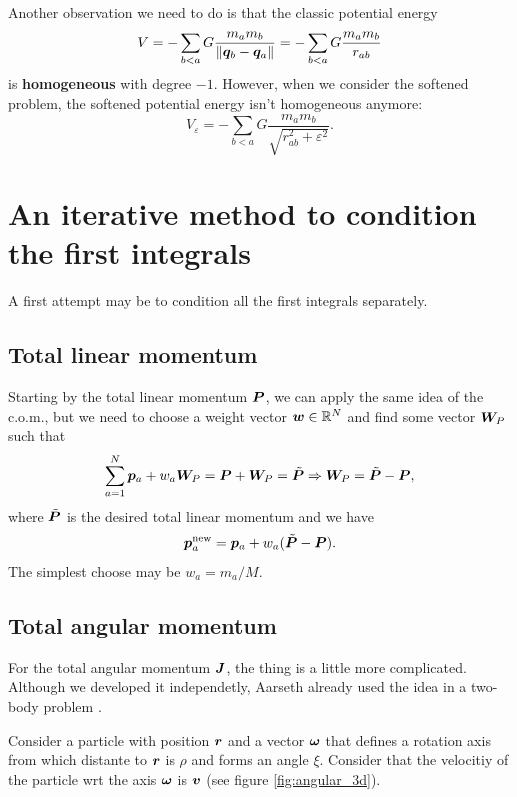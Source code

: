 \documentclass{article}
\begin{document}
Another observation we need to do is that the classic potential energy
\begin{equation}
V = - \sum_{b < a} G \dfrac{m_a m_b}{\left\Vert \bm q_b - \bm q_a \right\Vert}
= - \sum_{b < a} G \dfrac{m_a m_b}{r_{ab}}
\end{equation}
is \textbf{homogeneous} with degree $-1$. However, when we consider the softened problem, the softened potential energy isn't homogeneous anymore:
\begin{equation}
V_\varepsilon = - \sum_{b < a} G \dfrac{m_a m_b}{\sqrt{r_{ab}^2 + \varepsilon^2}}.
\end{equation}


\section{An iterative method to condition the first integrals}
A first attempt may be to condition all the first integrals separately. 

\subsection{Total linear momentum}
Starting by the total linear momentum $\bm P$, we can apply the same idea of the c.o.m., but we need to choose a weight vector $\bm w \in \mathbb{R}^N$ and find some vector $\bm W_P$ such that
\begin{equation}
    \sum_{a=1}^N \bm p_a + w_a \bm W_P = 
    \bm P + \bm W_P = \tilde{\bm P}
    \Rightarrow
    \bm W_P = \tilde{\bm P} - \bm P,
\end{equation}
where $\tilde{\bm P}$ is the desired total linear momentum and we have
\begin{equation}\label{eq:total_linear_momentum_conditioner_iterative}
\bm p_a^{\text{new}} = \bm p_a + w_a (\tilde{\bm P} - \bm P).
\end{equation}
The simplest choose may be $w_a = m_a / M$.

\subsection{Total angular momentum}
For the total angular momentum $\bm J$, the thing is a little more complicated. Although we developed it independetly, Aarseth already used the idea in a two-body problem \cite[p. 135]{aarseth_gravitational_2003}.

Consider a particle with position $\bm r$ and a vector $\bm \omega$ that defines a rotation axis from which distante to $\bm r$ is $\rho$ and forms an angle $\xi$. Consider that the velocitiy of the particle wrt the axis $\bm \omega$ is $\bm v$ (see figure \ref{fig:angular_3d}).
\end{document}

